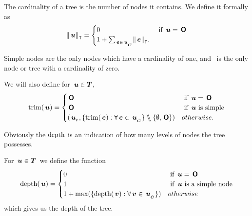 \begin{definition}
  The cardinality of a tree is the number of nodes it contains. We define it formally as
  \begin{align*}
    \lVert{\,\boldsymbol{u}}\rVert_{\intercal} = \begin{cases}
      0 & \text{ if } \,\boldsymbol{u} = \,\boldsymbol{\mathsf{O}}\\
      1 + \sum_{\,\boldsymbol{e}\in{\,\boldsymbol{u}}_{{}_{\bar{\boldsymbol{C}}}}} \lVert{\,\boldsymbol{e}}\rVert_{\intercal}.
    \end{cases}
  \end{align*}

  Simple nodes are the only nodes which have a cardinality of one, and \tzerotree\ is the only node or tree with a
  cardinality of zero.
\end{definition}

\begin{definition}
  We will also define for $\,\boldsymbol{u} \in \boldsymbol{T}$,
  \begin{align*}
    \operatorname{trim}(\,\boldsymbol{u}) = \begin{cases}
      \,\boldsymbol{\mathsf{O}} & \text{ if } \,\boldsymbol{u} = \,\boldsymbol{\mathsf{O}} \\
      \,\boldsymbol{\mathsf{O}} & \text{ if } \,\boldsymbol{u} \text{ is simple} \\
      ({\,\boldsymbol{u}}_{{}_{\mathsf{P}}}, \lbrace \operatorname{trim}(\,\boldsymbol{e}): \forall\,\boldsymbol{e}\in{\,\boldsymbol{u}}_{{}_{\bar{\boldsymbol{C}}}} \rbrace \bbslash \{\emptyset, \,\boldsymbol{\mathsf{O}}\}) & otherwise.
    \end{cases}
  \end{align*}
\end{definition}

Obviously the $\operatorname{depth}$ is an indication of how many levels of nodes
the tree possesses.

\begin{definition}
  For $\,\boldsymbol{u} \in \boldsymbol{T}$\ we define the function
  \begin{align*}
    \operatorname{depth}(\,\boldsymbol{u}) = \begin{cases}
      0 & \text{ if } \,\boldsymbol{u}  = \,\boldsymbol{\mathsf{O}} \\
      1 & \text{ if } \,\boldsymbol{u} \text{ is a simple node} \\
      1 + \max(\lbrace\operatorname{depth}(\,\boldsymbol{v}):\forall \,\boldsymbol{v} \in {\,\boldsymbol{u}}_{{}_{\bar{\boldsymbol{C}}}}\rbrace) & otherwise
    \end{cases}
  \end{align*}
  which gives us the depth of the tree.
\end{definition}

